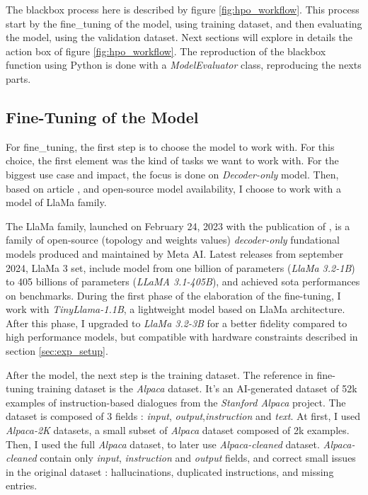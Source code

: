 The blackbox process here is described by figure \ref{fig:hpo_workflow}. This process start by the \gls{fine_tuning} of the model, using training dataset, and then evaluating the model, using the validation dataset. Next sections will explore in details the action box of figure \ref{fig:hpo_workflow}. The reproduction of the blackbox function using Python is done with a \textit{ModelEvaluator} class, reproducing the nexts parts.

\subsection{Fine-Tuning of the Model}
\label{sec:fine_tuning}

For \gls{fine_tuning}, the first step is to choose the model to work with. For this choice, the first element was the kind of tasks we want to work with. For the biggest use case and impact, the focus is done on \textit{Decoder-only} model. Then, based on article \cite{tribes_hyperparameter_2024}, and open-source model availability, I choose to work with a model of LlaMa family.

The LlaMa family, launched on February 24, 2023 with the publication of \cite{touvron_llama_2023}, is a family of open-source (topology and weights values) \textit{decoder-only} fundational models produced and maintained by Meta AI. Latest releases from september 2024, LlaMa 3\cite{grattafiori_llama_2024} set, include model from one billion of parameters (\textit{LlaMa 3.2-1B}) to 405 billions of parameters (\textit{LLaMA 3.1-405B}), and achieved \acrlong{sota} performances on benchmarks. During the first phase of the elaboration of the fine-tuning, I work with \textit{TinyLlama-1.1B}, a lightweight model based on LlaMa architecture. After this phase, I upgraded to \textit{LlaMa 3.2-3B} for a better fidelity compared to high performance models, but compatible with hardware constraints described in section \ref{sec:exp_setup}.

After the model, the next step is the training dataset. The reference in fine-tuning training dataset is the \textit{Alpaca} dataset\cite{hashimoto_stanford_2024}. It's an AI-generated dataset of 52k examples of instruction-based dialogues from the \textit{Stanford Alpaca} project. The dataset is composed of 3 fields : \textit{input}, \textit{output},\textit{instruction} and \textit{text}. At first, I used \textit{Alpaca-2K} datasets, a small subset of \textit{Alpaca} dataset composed of 2k examples. Then, I used the full \textit{Alpaca} dataset, to later use \textit{Alpaca-cleaned} dataset. \textit{Alpaca-cleaned} contain only \textit{input}, \textit{instruction} and \textit{output} fields, and correct small issues in the original dataset : hallucinations, duplicated instructions, and missing entries.

